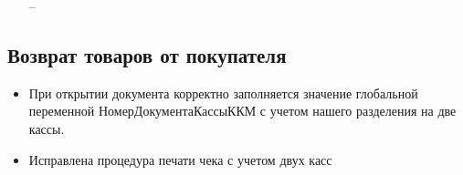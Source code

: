 \begin{itemize}
	\item [--]
\end{itemize}



\subsection{Возврат товаров от покупателя}
\begin{itemize}
	\item При открытии документа корректно заполняется значение глобальной переменной НомерДокументаКассыККМ
	 с учетом нашего разделения на две кассы. 
\item Исправлена процедура печати чека с учетом двух касс

\end{itemize}


